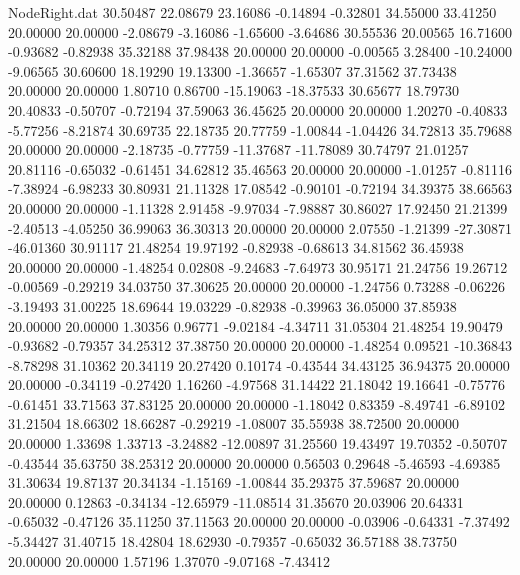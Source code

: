 \begin{filecontents}{NodeRight.dat}
  30.50487   22.08679   23.16086    -0.14894   -0.32801   34.55000   33.41250   20.00000   20.00000   -2.08679   -3.16086   -1.65600   -3.64686
  30.55536   20.00565   16.71600    -0.93682   -0.82938   35.32188   37.98438   20.00000   20.00000   -0.00565    3.28400  -10.24000   -9.06565
  30.60600   18.19290   19.13300    -1.36657   -1.65307   37.31562   37.73438   20.00000   20.00000    1.80710    0.86700  -15.19063  -18.37533
  30.65677   18.79730   20.40833    -0.50707   -0.72194   37.59063   36.45625   20.00000   20.00000    1.20270   -0.40833   -5.77256   -8.21874
  30.69735   22.18735   20.77759    -1.00844   -1.04426   34.72813   35.79688   20.00000   20.00000   -2.18735   -0.77759  -11.37687  -11.78089
  30.74797   21.01257   20.81116    -0.65032   -0.61451   34.62812   35.46563   20.00000   20.00000   -1.01257   -0.81116   -7.38924   -6.98233
  30.80931   21.11328   17.08542    -0.90101   -0.72194   34.39375   38.66563   20.00000   20.00000   -1.11328    2.91458   -9.97034   -7.98887
  30.86027   17.92450   21.21399    -2.40513   -4.05250   36.99063   36.30313   20.00000   20.00000    2.07550   -1.21399  -27.30871  -46.01360
  30.91117   21.48254   19.97192    -0.82938   -0.68613   34.81562   36.45938   20.00000   20.00000   -1.48254    0.02808   -9.24683   -7.64973
  30.95171   21.24756   19.26712    -0.00569   -0.29219   34.03750   37.30625   20.00000   20.00000   -1.24756    0.73288   -0.06226   -3.19493
  31.00225   18.69644   19.03229    -0.82938   -0.39963   36.05000   37.85938   20.00000   20.00000    1.30356    0.96771   -9.02184   -4.34711
  31.05304   21.48254   19.90479    -0.93682   -0.79357   34.25312   37.38750   20.00000   20.00000   -1.48254    0.09521  -10.36843   -8.78298
  31.10362   20.34119   20.27420     0.10174   -0.43544   34.43125   36.94375   20.00000   20.00000   -0.34119   -0.27420    1.16260   -4.97568
  31.14422   21.18042   19.16641    -0.75776   -0.61451   33.71563   37.83125   20.00000   20.00000   -1.18042    0.83359   -8.49741   -6.89102
  31.21504   18.66302   18.66287    -0.29219   -1.08007   35.55938   38.72500   20.00000   20.00000    1.33698    1.33713   -3.24882  -12.00897
  31.25560   19.43497   19.70352    -0.50707   -0.43544   35.63750   38.25312   20.00000   20.00000    0.56503    0.29648   -5.46593   -4.69385
  31.30634   19.87137   20.34134    -1.15169   -1.00844   35.29375   37.59687   20.00000   20.00000    0.12863   -0.34134  -12.65979  -11.08514
  31.35670   20.03906   20.64331    -0.65032   -0.47126   35.11250   37.11563   20.00000   20.00000   -0.03906   -0.64331   -7.37492   -5.34427
  31.40715   18.42804   18.62930    -0.79357   -0.65032   36.57188   38.73750   20.00000   20.00000    1.57196    1.37070   -9.07168   -7.43412

\end{filecontents}
